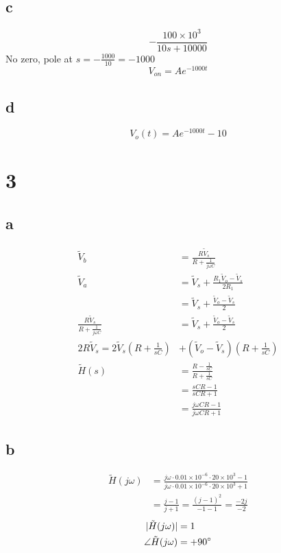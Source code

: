 \documentclass{article}
\begin{document}
\begin{multicols}{2}
\subsection*{c}
$$
    -\frac{100\times 10^3}{10s+10000}
$$
No zero, pole at $s = -\frac{1000}{10} = -1000$
$$
V_{on} = A e^{-1000t}
$$
\subsection*{d}
$$
V_o (t) = A e^{-1000t} - 10
$$
\section*{3}
\subsection*{a}
\begin{align*}
    \tilde{V}_b &= \frac{R \tilde{V}_s}{R+\frac{1}{j\omega C}}\\
    \tilde{V}_a &= \tilde{V}_s + \frac{R_1\tilde{V}_o - \tilde{V}_s}{2R_1}\\
    &= \tilde{V}_s + \frac{\tilde{V}_o - \tilde{V}_s}{2}\\
    \frac{R \tilde{V}_s}{R+\frac{1}{j\omega C}} &= \tilde{V}_s + \frac{\tilde{V}_o - \tilde{V}_s}{2}\\
    2R\tilde{V}_s = 2 \tilde{V}_s \left( R + \frac{1}{sC} \right) &+ \left(\tilde{V}_o - \tilde{V}_s\right)\left(R+\frac{1}{sC}\right)\\
    \tilde{H}(s) &= \frac{R-\frac{1}{sC}}{R+\frac{1}{sC}}\\
    &= \frac{sCR-1}{sCR+1}\\
    &= \frac{j\omega CR-1}{j\omega CR+1}
\end{align*}
\subsection*{b}
\begin{align*}
    \tilde{H}(j\omega) &= \frac{j\omega\cdot 0.01\times 10^{-6}\cdot 20\times10^3 -1}{j\omega\cdot 0.01\times 10^{-6}\cdot 20\times10^3+1}\\
    &= \frac{j-1}{j+1} = \frac{(j-1)^2}{-1-1} = \frac{-2j}{-2}
\end{align*}
\begin{align*}
    |\tilde{H}(j\omega)| &= 1\\
    \angle \tilde{H}(j\omega) &= +90\degree
\end{align*}
\end{multicols}
\end{document}
